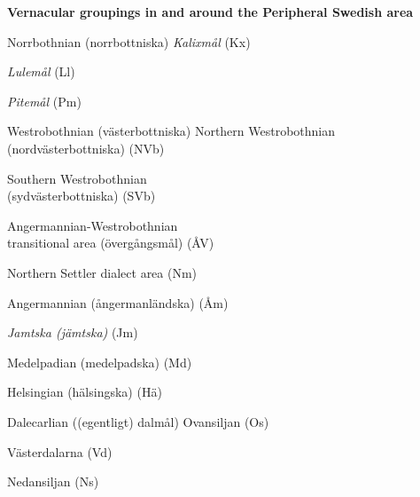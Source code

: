 \textbf{Vernacular groupings in and around the Peripheral Swedish area}

\item 

Norrbothnian (norrbottniska)  \textit{Kalixmål} (Kx)

\item 

\textit{Lulemål} (Ll)

\item 

\textit{Pitemål} (Pm)


\item 

Westrobothnian (västerbottniska)  Northern Westrobothnian (nordvästerbottniska) (NVb)

\item 

Southern Westrobothnian\\
(sydvästerbottniska) (SVb)

\item 

Angermannian-Westrobothnian\\
transitional area (övergångsmål) (ÅV)


Northern Settler dialect area (Nm)  

Angermannian (ångermanländska) (Åm)  

\textit{Jamtska (jämtska)} (Jm)  

Medelpadian (medelpadska) (Md)  

Helsingian (hälsingska) (Hä)  

\item 

Dalecarlian ((egentligt) dalmål)  Ovansiljan (Os)

\item 

Västerdalarna (Vd)

\item 

Nedansiljan (Ns)


